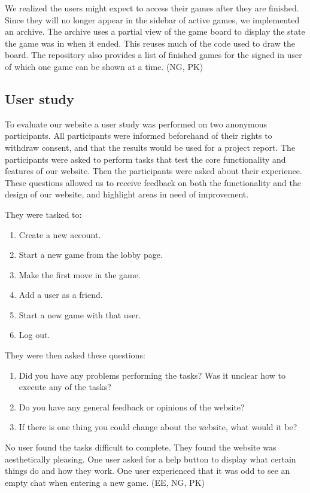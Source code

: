 \documentclass[acmlarge, review=false, screen=true]{acmart}
\begin{document}
    We realized the users might expect to access their games after they are finished. Since they will no longer appear in the sidebar of active games, we implemented an archive. The archive uses a partial view of the game board to display the state the game was in when it ended. This reuses much of the code used to draw the board. The repository also provides a list of finished games for the signed in user of which one game can be shown at a time. (NG, PK)



  \subsection{User study}
    To evaluate our website a user study was performed on two anonymous participants. All participants were informed beforehand of their rights to withdraw consent, and that the results would be used for a project report. The participants were asked to perform tasks that test the core functionality and features of our website. Then the participants were asked about their experience. These questions allowed us to receive feedback on both the functionality and the design of our website, and highlight areas in need of improvement. 

    They were tasked to:
    \begin{enumerate}
      \item Create a new account.
      \item Start a new game from the lobby page.
      \item Make the first move in the game.
      \item Add a user as a friend.
      \item Start a new game with that user.
      \item Log out.
    \end{enumerate}

    They were then asked these questions:
    \begin{enumerate}
      \item Did you have any problems performing the tasks? Was it unclear how to execute any of the tasks?
      \item Do you have any general feedback or opinions of the website?
      \item If there is one thing you could change about the website, what would it be?
    \end{enumerate}

    No user found the tasks difficult to complete. They found the website was aesthetically pleasing. One user asked for a help button to display what certain things do and how they work. One user experienced that it was odd to see an empty chat when entering a new game. (EE, NG, PK)
\end{document}
